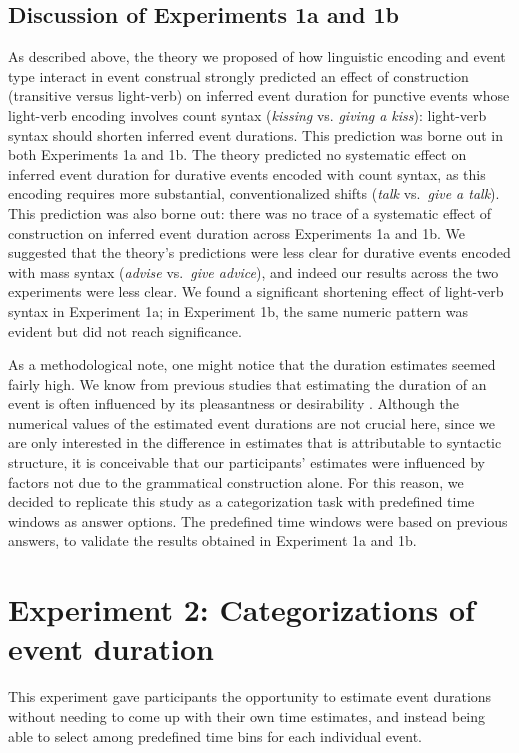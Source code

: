 \documentclass[review,12pt,authoryear]{elsarticle}
\newcommand*{\sectionformat}{\centering}
\begin{document}
\subsection*{\sectionformat Discussion of Experiments 1a and 1b}\label{sec_discOE}
As described above, the theory we proposed of how linguistic encoding and event type interact in event construal strongly predicted an effect of construction (transitive versus light-verb) on inferred event duration for punctive events whose light-verb encoding involves count syntax (\emph{kissing} vs. \emph{giving a kiss}): light-verb syntax should shorten inferred event durations.  This prediction was borne out in both Experiments 1a and 1b.  The theory predicted no systematic effect on inferred event duration for durative events encoded with count syntax, as this encoding requires more substantial, conventionalized  shifts  (\emph{talk} vs.\ \emph{give a talk}).  This prediction was also borne out: there was no trace of a systematic effect of construction on inferred event duration across Experiments 1a and 1b.  We suggested that the theory's predictions were less clear for durative events encoded with mass syntax (\emph{advise} vs.\ \emph{give advice}), and indeed our results across the two experiments were less clear. We found a significant shortening effect of light-verb syntax in Experiment 1a; in Experiment 1b, the same numeric pattern was evident but did not reach significance.

As a methodological note, one might notice that the duration estimates seemed fairly high. We know from previous studies that estimating the duration of an event is often influenced by its pleasantness or desirability \citep{roy2005underestimating,kahneman1977intuitive}. Although the numerical values of the estimated event durations are not crucial here, since we are only interested in the difference in estimates that is attributable to syntactic structure, it is conceivable that our participants' estimates were influenced by factors not due to the grammatical construction alone. For this reason, we decided to replicate this study as a categorization task with predefined time windows as answer options. The predefined time windows were based on previous answers, to validate the results obtained in Experiment 1a and 1b. 

\section*{\sectionformat Experiment 2: Categorizations of event duration}\label{sec_exCat}
This experiment gave participants the opportunity to estimate event durations without needing to come up with their own time estimates, and instead being able to select among predefined time bins for each individual event. 
\end{document}
